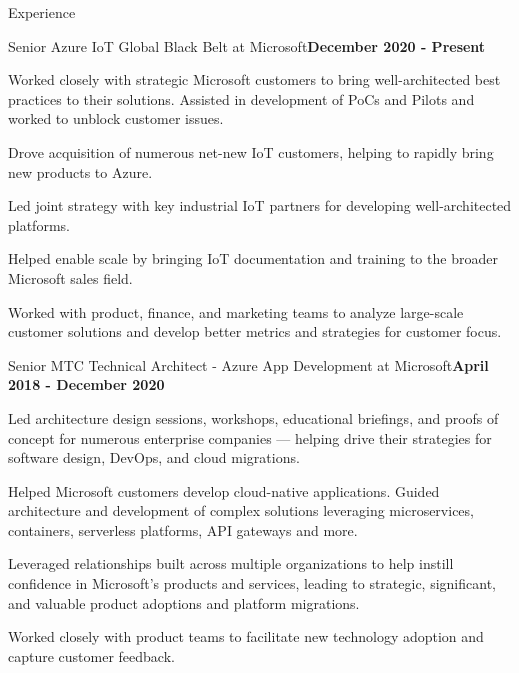 \documentclass{resume} %
\begin{document}
\begin{rSection}{Experience}


\begin{rSubsection}{Senior Azure IoT Global Black Belt at Microsoft}{\bf December 2020 - Present}{}{}

\item Worked closely with strategic Microsoft customers to bring well-architected best practices to their solutions. Assisted in development of PoCs and Pilots and worked to unblock customer issues.  
\item Drove acquisition of numerous net-new IoT customers, helping to rapidly bring new products to Azure.
\item Led joint strategy with key industrial IoT partners for developing well-architected platforms.
\item Helped enable scale by bringing IoT documentation and training to the broader Microsoft sales field.
\item Worked with product, finance, and marketing teams to analyze large-scale customer solutions and develop better metrics and strategies for customer focus.

\end{rSubsection}


\begin{rSubsection}{Senior MTC Technical Architect - Azure App Development at Microsoft}{\bf April 2018 - December 2020}{}{}

\item Led architecture design sessions, workshops, educational briefings, and proofs of concept for numerous enterprise companies --- helping drive their strategies for software design, DevOps, and cloud migrations.
\item Helped Microsoft customers develop cloud-native applications.  Guided architecture and development of complex solutions leveraging microservices, containers, serverless platforms, API gateways and more.
\item Leveraged relationships built across multiple organizations to help instill confidence in Microsoft's products and services, leading to strategic, significant, and valuable product adoptions and platform migrations.
\item Worked closely with product teams to facilitate new technology adoption and capture customer feedback.
    

\end{rSubsection}
\end{rSection}
\end{document}
